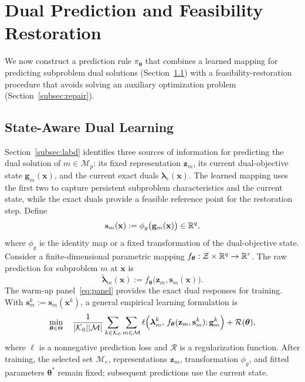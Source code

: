 
\section{Dual Prediction and Feasibility Restoration}
\label{sec:method}

We now construct a prediction rule $\pi_{\boldsymbol\theta}$
that combines a learned mapping for predicting subproblem
dual solutions (Section~\ref{subsec:direct}) with a
feasibility-restoration procedure that avoids solving
an auxiliary optimization problem
(Section~\ref{subsec:repair}).

\subsection{State-Aware Dual Learning}
\label{subsec:direct}

Section~\ref{subsec:labd} identifies three sources of
information for predicting the dual solution of
$m\in\mathcal M_p$: its fixed representation
$\mathbf z_m$, its current dual-objective state
$\mathbf g_m(\mathbf x)$, and the current exact duals
$\boldsymbol\lambda_e(\mathbf x)$. The learned mapping
uses the first two to capture persistent subproblem
characteristics and the current state, while the exact
duals provide a feasible reference point for the
restoration step. Define
\begin{equation}\label{eq:state-transformation}
\mathbf s_m(\mathbf x):=
\phi_g\bigl(\mathbf g_m(\mathbf x)\bigr)\in\mathbb{R}^q,
\end{equation}
where $\phi_g$ is the identity map or a fixed
transformation of the dual-objective state.
Consider a finite-dimensional parametric mapping
$f_{\boldsymbol\theta}:\mathcal Z\times\mathbb{R}^q\to\mathbb{R}^r$.
The raw prediction for subproblem $m$ at $\mathbf x$ is
\begin{equation}\label{eq:raw-prediction}
\widetilde{\boldsymbol\lambda}_m(\mathbf x)
:=f_{\boldsymbol\theta}
\bigl(\mathbf z_m,\mathbf s_m(\mathbf x)\bigr).
\end{equation}
The warm-up panel~\eqref{eq:panel} provides the exact
dual responses for training. With
$\mathbf s_m^k:=\mathbf s_m(\mathbf x^k)$,
a general empirical learning formulation is
\begin{equation}\label{model:training}
\min_{\boldsymbol\theta\in\Theta}\quad
\frac{1}{|\mathcal K_0||\mathcal M|}
\sum_{k\in\mathcal K_0}\sum_{m\in\mathcal M}
\ell\Bigl(
\boldsymbol\lambda_m^k,\,
f_{\boldsymbol\theta}(\mathbf z_m,\mathbf s_m^k);
\mathbf g_m^k
\Bigr)+\mathcal R(\boldsymbol\theta),
\end{equation}
where $\ell$ is a nonnegative prediction loss and
$\mathcal R$ is a regularization function.
After training, the selected set $\mathcal M_e$,
representations $\mathbf z_m$, transformation $\phi_g$,
and fitted parameters $\boldsymbol\theta^*$ remain fixed;
subsequent predictions use the current state.

